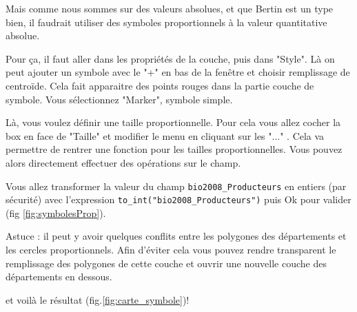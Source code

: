 \documentclass[a4paper, 11pt]{article}
\begin{document}
  Mais comme nous sommes sur des valeurs absolues, et que Bertin est un type bien, il faudrait utiliser des symboles proportionnels à la valeur quantitative absolue.

  Pour ça, il faut aller dans les propriétés de la couche, puis dans "Style". Là on peut ajouter un symbole avec le "+" en bas de la fenêtre et choisir remplissage de centroïde. Cela fait apparaitre des points rouges dans la partie couche de symbole. Vous sélectionnez "Marker", symbole simple.

  Là, vous voulez définir une taille proportionnelle. Pour cela vous allez cocher la box en face de "Taille" et modifier le menu en cliquant sur les "..." . Cela va permettre de rentrer une fonction pour les tailles proportionnelles. Vous pouvez alors directement effectuer des opérations sur le champ.

  Vous allez transformer la valeur du champ \texttt{bio2008\_Producteurs} en entiers (par sécurité) avec l'expression \texttt{to\_int("bio2008\_Producteurs")}
  puis Ok pour valider (fig \ref{fig:symbolesProp}).

  Astuce : il peut y avoir quelques conflits entre les polygones des départements et les cercles proportionnels. Afin d'éviter cela vous pouvez rendre transparent le remplissage des polygones de cette couche et ouvrir une nouvelle couche des départements en dessous.

  et voilà le résultat (fig.\ref{fig:carte_symbole})!
\end{document}
